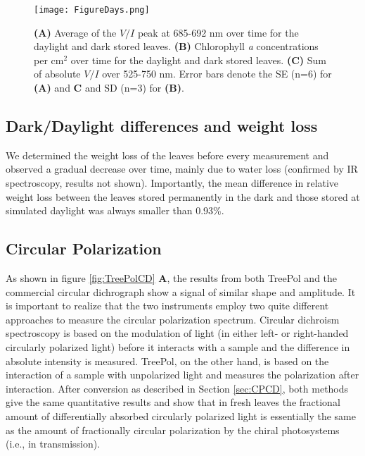 \documentclass[review]{elsarticle}
\begin{document}
\begin{figure*}[]
  \centering
  \texttt{[image: FigureDays.png]}
  \caption{\textbf{(A)} Average of the $V/I$ peak at 685-692 nm over time for the daylight and dark stored leaves. \textbf{(B)} Chlorophyll \textit{a} concentrations per cm$^{2}$ over time for the daylight and dark stored leaves. \textbf{(C)} Sum of  absolute $V/I$ over 525-750 nm. Error bars denote the SE (n=6) for \textbf{(A)} and \textbf{C} and SD (n=3) for \textbf{(B)}.}
  \label{fig:Day}
\end{figure*}

\subsection{Dark/Daylight differences and weight loss}
We determined the weight loss of the leaves before every measurement and observed a gradual decrease over time, mainly due to water loss (confirmed by IR spectroscopy, results not shown). Importantly, the mean difference in relative weight loss between the leaves stored permanently in the dark and those stored at simulated daylight was always smaller than 0.93\%. 

\subsection{Circular Polarization}
As shown in figure \ref{fig:TreePolCD} \textbf{A}, the results from both TreePol and the commercial circular dichrograph show a signal of similar shape and amplitude. It is important to realize that the two instruments employ two quite different approaches to measure the circular polarization spectrum. Circular dichroism spectroscopy is based on the modulation of light (in either left- or right-handed circularly polarized light) before it interacts with a sample and the difference in absolute intensity is measured. TreePol, on the other hand, is based on the interaction of a sample with unpolarized light and measures the polarization after interaction. After conversion as described in Section \ref{sec:CPCD}, both methods give the same quantitative results and show that in fresh leaves the fractional amount of differentially absorbed circularly polarized light is essentially the same as the amount of fractionally circular polarization by the chiral photosystems (i.e., in transmission). 
\end{document}
